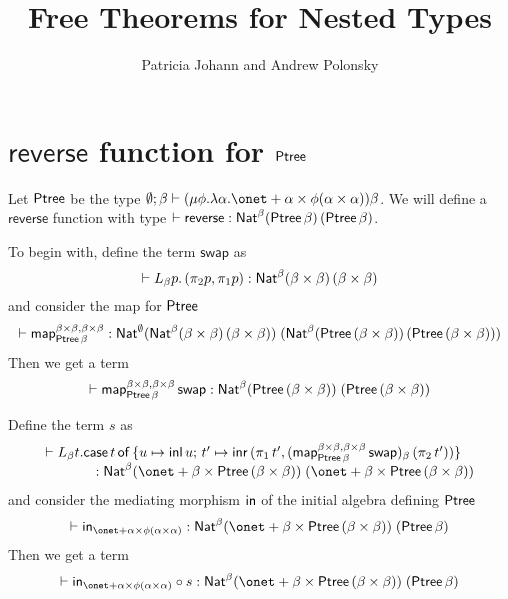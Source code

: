\documentclass[acmsmall,review,anonymous]{acmart}
\title[Free Theorems for Nested Types]{Free Theorems for 
Nested Types} %
\author{Patricia Johann and Andrew Polonsky}
\affiliation{
  \institution{Appalachian State University}            %
}
\theoremstyle{definition}
\newcommand{\map}{\mathsf{map}}
\begin{document}
\newcommand{\tb}[1]{~~ \mbox{#1} ~~}
\newcommand{\listt}[1]{(\mu \phi. \lambda \beta . \onet + \beta \times \phi \beta) #1}
\newcommand{\filtype}{\Nat^\emptyset 
  \, (\Nat^\emptyset \, \alpha \, \mathit{Bool}) (\Nat^\emptyset \, (\GRose\, \psi\, \alpha) \, (\GRose\, \psi\, (\alpha + \onet)))}
\newcommand{\maplist}{\map_{\lambda A. \setsem{\emptyset; \alpha \vdash List \, \alpha} \rho[\alpha := A]}}

\newcommand{\swap}{\mathsf{swap}}
\newcommand{\reverse}{\mathsf{reverse}}

\maketitle

\section{$\reverse$ function for $\mathsf{Ptree}$}

Let $\mathsf{Ptree}$ be the type $\emptyset; \beta \vdash (\mu \phi. \lambda \alpha. \onet + \alpha \times \phi(\alpha \times \alpha))\beta$.
We will define a $\reverse$ function with type $\vdash \reverse : \Nat^{\beta} (\Ptree\,\beta)\,(\Ptree\,\beta)$.

To begin with, define the term $\swap$ as
\[
	\vdash L_{\beta} p.\, (\pi_2 p, \pi_1 p) : \mathsf{Nat}^{\beta} (\beta \times \beta)\, (\beta \times \beta)
\]
and consider the map for $\mathsf{Ptree}$
\[
	\vdash \map_{\Ptree\,\beta}^{\beta \times \beta, \beta \times \beta}
	: \Nat^{\emptyset}
	(\Nat^{\beta} (\beta \times \beta)\, (\beta \times \beta))\;
	(\Nat^{\beta} (\Ptree\,(\beta \times \beta))\, (\Ptree\,(\beta \times \beta)))
\]
Then we get a term
\[
	\vdash \map_{\Ptree\,\beta}^{\beta \times \beta, \beta \times \beta}\, \swap
	: \Nat^{\beta} (\Ptree\,(\beta \times \beta))\; (\Ptree\,(\beta \times \beta))
\]

Define the term $s$ as
\[
\begin{array}{l}
	\vdash L_{\beta} t. \case{t}{u \mapsto \inl\, u}{t' \mapsto \inr\,(\pi_1\, t', (\map_{\Ptree\,\beta}^{\beta \times \beta, \beta \times \beta}\, \swap)_{\beta}\, (\pi_2\, t') )} \\
	\hspace*{0.5in} : \Nat^{\beta} (\onet + \beta \times \Ptree\,(\beta \times \beta))\;  (\onet + \beta \times \Ptree\,(\beta \times \beta))
\end{array}
\]
and consider the mediating morphism $\mathsf{in}$ of the initial algebra defining $\mathsf{Ptree}$
\[
	\vdash \tin_{\onet + \alpha \times \phi(\alpha \times \alpha)}
	: \Nat^{\beta} (\onet + \beta \times \Ptree\,(\beta \times \beta)) \; (\Ptree\, \beta)
\]
Then we get a term
\[
	\vdash \tin_{\onet + \alpha \times \phi(\alpha \times \alpha)} \circ s
	: \Nat^{\beta} (\onet + \beta \times \Ptree\,(\beta \times \beta)) \; (\Ptree\,\beta)
\]
\end{document}
